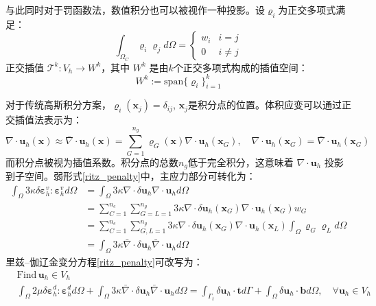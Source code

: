 与此同时对于罚函数法，数值积分也可以被视作一种投影。设$\varrho_i$为正交多项式满足：
\begin{equation}
    \int_{\Omega_C} \varrho_i \varrho_j d\Omega = 
    \begin{cases}
        w_i  & i = j \\
        0 & i \ne j
    \end{cases}
\end{equation}
正交插值 $\mathcal T^{k}: V_h \rightarrow W^{k}$，其中 $W^{k}$ 是由$k$个正交多项式构成的插值空间：
\begin{equation}
    W^{k}:= \mathrm{span}\{\varrho_i \}_{i=1}^{k}
\end{equation}

对于传统高斯积分方案，$\varrho_i(\boldsymbol x_j) = \delta_{ij}$, $\boldsymbol x_j$是积分点的位置。体积应变可以通过正交插值法表示为：
\begin{equation}
    \nabla \cdot \boldsymbol u_h(\boldsymbol x) \approx \bar \nabla \cdot \boldsymbol u_h(\boldsymbol x) = \sum_{G=1}^{n_g} \varrho_G(\boldsymbol x) \nabla \cdot \boldsymbol u_h(\boldsymbol x_G), \quad \nabla \cdot \boldsymbol u_h(\boldsymbol x_G) = \bar \nabla \cdot \boldsymbol u_h(\boldsymbol x_G)
\end{equation}
而积分点被视为插值系数。积分点的总数$n_g$低于完全积分，这意味着 $\nabla \cdot \boldsymbol u_h$ 投影到子空间。弱形式\eqref{ritz_penalty}中，主应力部分可转化为：
\begin{equation}\label{projection_penalty}
    \begin{split}
        \int_\Omega 3\kappa \delta \boldsymbol \varepsilon^v_h : \boldsymbol \varepsilon^v_h d\Omega &=\int_\Omega 3\kappa \nabla \cdot \delta \boldsymbol u_h \nabla \cdot \boldsymbol u_h d\Omega  \\
        &= \sum_{C=1}^{n_e} \sum_{G=L=1}^{n_g} 3\kappa \nabla \cdot \delta \boldsymbol u_h(\boldsymbol x_G) \nabla \cdot \boldsymbol u_h(\boldsymbol x_G) w_G \\
        &= \sum_{C=1}^{n_e} \sum_{G,L=1}^{n_g} 3\kappa \nabla \cdot \delta \boldsymbol u_h(\boldsymbol x_G) \nabla \cdot \boldsymbol u_h(\boldsymbol x_L) \int_\Omega \varrho_G \varrho_L d\Omega  \\
        &=\int_\Omega 3\kappa \bar\nabla \cdot \delta \boldsymbol u_h \bar\nabla \cdot \boldsymbol u_h d\Omega
    \end{split}
\end{equation}
里兹--伽辽金变分方程\eqref{ritz_penalty}可改写为：
\begin{equation}\label{ritz_penalty_new}
    \begin{split}
    &\text{Find}\,\boldsymbol u_h \in V_h\\
    &\int_\Omega 2\mu \delta \boldsymbol \varepsilon^d_h : \boldsymbol \varepsilon^d_h d\Omega +
    \int_\Omega 3\kappa \bar \nabla \cdot \delta \boldsymbol u_h \bar \nabla \cdot \boldsymbol u_h d\Omega =
    \int_{\Gamma_t} \delta \boldsymbol u_h \cdot \boldsymbol t d\Gamma + \int_\Omega \delta \boldsymbol u_h \cdot \boldsymbol b d\Omega, \quad \forall \boldsymbol u_h \in V_h
    \end{split}
\end{equation}

